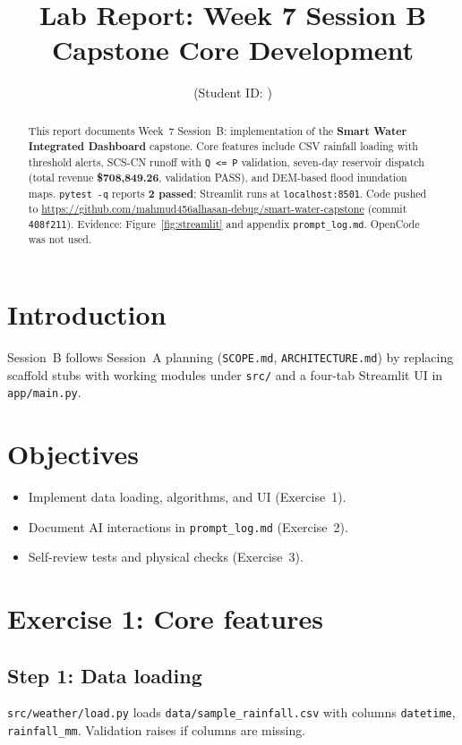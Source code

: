 \documentclass[11pt,a4paper]{article}
\title{Lab Report: Week 7 Session B\\Capstone Core Development}
\author{\studentname \quad (Student ID: \studentid)}
\date{\reportdate}
\newcommand{\capstonerepo}{https://github.com/mahmud456alhasan-debug/smart-water-capstone}
\begin{document}
\maketitle

\begin{abstract}
This report documents Week~7 Session~B: implementation of the \textbf{Smart Water Integrated Dashboard} capstone. Core features include CSV rainfall loading with threshold alerts, SCS-CN runoff with \texttt{Q <= P} validation, seven-day reservoir dispatch (total revenue \textbf{\$708,849.26}, validation PASS), and DEM-based flood inundation maps. \texttt{pytest -q} reports \textbf{2 passed}; Streamlit runs at \texttt{localhost:8501}. Code pushed to \url{\capstonerepo} (commit \texttt{408f211}). Evidence: Figure~\ref{fig:streamlit} and appendix \texttt{prompt\_log.md}. OpenCode was not used.
\end{abstract}

\section{Introduction}
Session~B follows Session~A planning (\texttt{SCOPE.md}, \texttt{ARCHITECTURE.md}) by replacing scaffold stubs with working modules under \texttt{src/} and a four-tab Streamlit UI in \texttt{app/main.py}.

\section{Objectives}
\begin{itemize}[noitemsep]
  \item Implement data loading, algorithms, and UI (Exercise~1).
  \item Document AI interactions in \texttt{prompt\_log.md} (Exercise~2).
  \item Self-review tests and physical checks (Exercise~3).
\end{itemize}

\section{Exercise 1: Core features}

\subsection{Step 1: Data loading}
\texttt{src/weather/load.py} loads \texttt{data/sample\_rainfall.csv} with columns \texttt{datetime}, \texttt{rainfall\_mm}. Validation raises if columns are missing.
\end{document}
